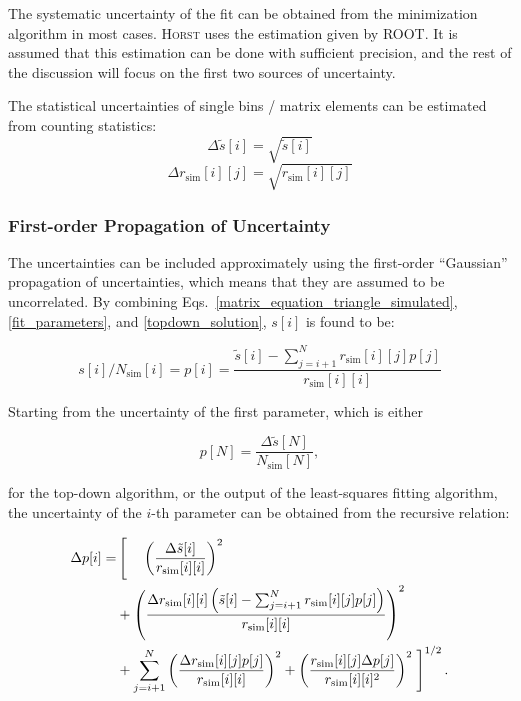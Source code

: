 \documentclass{article}
\begin{document}
\noindent The systematic uncertainty of the fit can be obtained from the minimization algorithm in most cases.
\textsc{Horst} uses the estimation given by \textsc{ROOT}.
It is assumed that this estimation can be done with sufficient precision, and the rest of the discussion will focus on the first two sources of uncertainty.

The statistical uncertainties of single bins / matrix elements can be estimated from counting statistics:
%
\begin{equation}
	\label{spectrum_uncertainty}
	\Delta \tilde{s} [i] = \sqrt{ \tilde{s}[i] }
\end{equation}
\begin{equation}
	\label{simulation_uncertainty}
	\Delta r_\mathrm{sim} [i][j] = \sqrt{ r_\mathrm{sim}[i][j] }
\end{equation}

\subsubsection{First-order Propagation of Uncertainty}

The uncertainties can be included approximately using the first-order ``Gaussian'' propagation of uncertainties, which means that they are assumed to be uncorrelated.
By combining Eqs.~\eqref{matrix_equation_triangle_simulated}, \eqref{fit_parameters}, and \eqref{topdown_solution}, $s[i]$ is found to be:

\begin{equation}
	\label{topdown_solution_with_simulation}
	s[i] / N_\mathrm{sim} [i] = p[i] = \frac{\tilde{s}[i] - \sum_{j = i+1}^{N} r_\mathrm{sim}[i][j] p[j]}{r_\mathrm{sim}[i][i]}
\end{equation}

\noindent Starting from the uncertainty of the first parameter, which is either

\begin{equation}
	p[N] = \frac{\Delta \tilde{s} [N]}{N_\mathrm{sim}[N]},
\end{equation}

\noindent for the top-down algorithm, or the output of the least-squares fitting algorithm, the uncertainty of the $i$-th parameter can be obtained from the recursive relation:

\begin{align}
	\Delta p[i] = &\left[ \vphantom{\left(\frac{\Delta \tilde s[i]}{r_\mathrm{sim} [i][i]} \right)^2 } \right. \phantom{+} \left( \frac{\Delta \tilde s[i]}{r_\mathrm{sim} [i][i]} \right)^2 \nonumber \\
	& + \left( \frac{\Delta r_\mathrm{sim} [i][i] \left(\tilde{s}[i] - \sum_{j=i+1}^{N} r_\mathrm{sim} [i][j] p[j]\right)}{r_\mathrm{sim} [i][i]} \right)^2 \\
	& + \sum_{j=i+1}^N \left( \frac{\Delta r_\mathrm{sim} [i][j] p[j]}{r_\mathrm{sim} [i][i]} \right)^2 + \left( \frac{r_\mathrm{sim} [i][j] \Delta p[j]}{r_\mathrm{sim} [i][i]^2} \right)^2 \left. \vphantom{\left(\frac{\Delta \tilde s[i]}{r_\mathrm{sim} [i][i]} \right)^2} \right]^{1/2}. \nonumber
\end{align}
\end{document}
